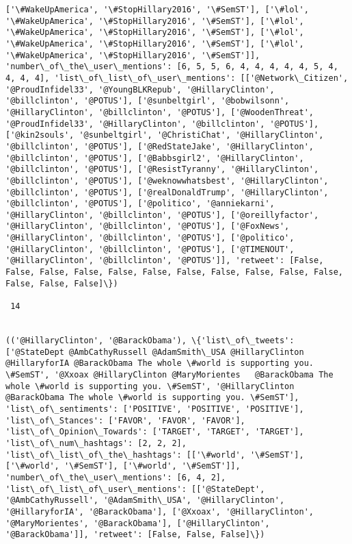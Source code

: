 \documentclass[11pt]{article}
\begin{document}
\begin{Verbatim}[commandchars=\\\{\}]
['\#WakeUpAmerica', '\#StopHillary2016', '\#SemST'], ['\#lol', '\#WakeUpAmerica', '\#StopHillary2016', '\#SemST'], ['\#lol', '\#WakeUpAmerica', '\#StopHillary2016', '\#SemST'], ['\#lol', '\#WakeUpAmerica', '\#StopHillary2016', '\#SemST'], ['\#lol', '\#WakeUpAmerica', '\#StopHillary2016', '\#SemST']], 'number\_of\_the\_user\_mentions': [6, 5, 5, 6, 4, 4, 4, 4, 4, 5, 4, 4, 4, 4], 'list\_of\_list\_of\_user\_mentions': [['@Network\_Citizen', '@ProudInfidel33', '@YoungBLKRepub', '@HillaryClinton', '@billclinton', '@POTUS'], ['@sunbeltgirl', '@bobwilsonn', '@HillaryClinton', '@billclinton', '@POTUS'], ['@WoodenThreat', '@ProudInfidel33', '@HillaryClinton', '@billclinton', '@POTUS'], ['@kin2souls', '@sunbeltgirl', '@ChristiChat', '@HillaryClinton', '@billclinton', '@POTUS'], ['@RedStateJake', '@HillaryClinton', '@billclinton', '@POTUS'], ['@Babbsgirl2', '@HillaryClinton', '@billclinton', '@POTUS'], ['@ResistTyranny', '@HillaryClinton', '@billclinton', '@POTUS'], ['@weknowwhatsbest', '@HillaryClinton', '@billclinton', '@POTUS'], ['@realDonaldTrump', '@HillaryClinton', '@billclinton', '@POTUS'], ['@politico', '@anniekarni', '@HillaryClinton', '@billclinton', '@POTUS'], ['@oreillyfactor', '@HillaryClinton', '@billclinton', '@POTUS'], ['@FoxNews', '@HillaryClinton', '@billclinton', '@POTUS'], ['@politico', '@HillaryClinton', '@billclinton', '@POTUS'], ['@TIMENOUT', '@HillaryClinton', '@billclinton', '@POTUS']], 'retweet': [False, False, False, False, False, False, False, False, False, False, False, False, False, False]\})

 14
 

(('@HillaryClinton', '@BarackObama'), \{'list\_of\_tweets': ['@StateDept @AmbCathyRussell @AdamSmith\_USA @HillaryClinton @HillaryforIA @BarackObama The whole \#world is supporting you. \#SemST', '@Xxoax @HillaryClinton @MaryMorientes   @BarackObama The whole \#world is supporting you. \#SemST', '@HillaryClinton @BarackObama The whole \#world is supporting you. \#SemST'], 'list\_of\_sentiments': ['POSITIVE', 'POSITIVE', 'POSITIVE'], 'list\_of\_Stances': ['FAVOR', 'FAVOR', 'FAVOR'], 'list\_of\_Opinion\_Towards': ['TARGET', 'TARGET', 'TARGET'], 'list\_of\_num\_hashtags': [2, 2, 2], 'list\_of\_list\_of\_the\_hashtags': [['\#world', '\#SemST'], ['\#world', '\#SemST'], ['\#world', '\#SemST']], 'number\_of\_the\_user\_mentions': [6, 4, 2], 'list\_of\_list\_of\_user\_mentions': [['@StateDept', '@AmbCathyRussell', '@AdamSmith\_USA', '@HillaryClinton', '@HillaryforIA', '@BarackObama'], ['@Xxoax', '@HillaryClinton', '@MaryMorientes', '@BarackObama'], ['@HillaryClinton', '@BarackObama']], 'retweet': [False, False, False]\})


\end{Verbatim}
\end{document}
